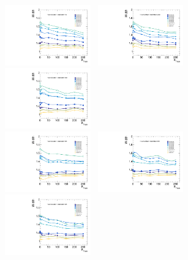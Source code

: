 \begin{figure}[!ht]
  \centering
  \includegraphics[width=0.33\textwidth]{Fig/BiasStudy/Linearity/ZJpsiG_Cat3/pull_width_linearity_TrueFunc0}~
  \includegraphics[width=0.33\textwidth]{Fig/BiasStudy/Linearity/ZJpsiG_Cat3/pull_width_linearity_TrueFunc1}~
  \includegraphics[width=0.33\textwidth]{Fig/BiasStudy/Linearity/ZJpsiG_Cat3/pull_width_linearity_TrueFunc2}\\
  \includegraphics[width=0.33\textwidth]{Fig/BiasStudy/Linearity/ZJpsiG_Cat3/pull_width_linearity_TrueFunc3}~
  \includegraphics[width=0.33\textwidth]{Fig/BiasStudy/Linearity/ZJpsiG_Cat3/pull_width_linearity_TrueFunc4}~
  \includegraphics[width=0.33\textwidth]{Fig/BiasStudy/Linearity/ZJpsiG_Cat3/pull_width_linearity_TrueFunc5}\\

\end{figure}
